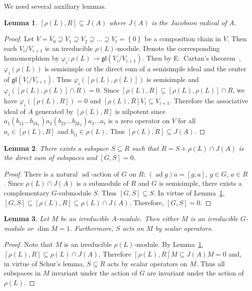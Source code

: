 \documentclass[12pt, reqno, a4paper]{amsart}
\theoremstyle{plain}
\newtheorem{lemma}{Lemma}
\theoremstyle{remark}
\theoremstyle{definition}
\begin{document}
We need several auxiliary lemmas.

\begin{lemma}\label{LemmaLR}
$[\rho(L), R] \subseteq J(A)$ where $J(A)$ is the Jacobson radical of $A$.
\end{lemma}
\begin{proof}
Let $V = V_0 \supseteq V_1 \supseteq V_2 \supseteq \ldots \supseteq V_t = \left\lbrace 0 \right\rbrace$
be a composition chain in $V$.
Then each $V_i/V_{i+1}$ is an irreducible $\rho(L)$-module.
Denote the corresponding homomorphism by $\varphi_i \colon \rho(L) \to
\mathfrak{gl}(V_i/V_{i+1})$. Then by E.~Cartan's theorem~\cite[Proposition~1.4.11]{GotoGrosshans},
$\varphi_i (\rho(L))$ is semisimple or the direct sum of a semisimple ideal and
the center of $\mathfrak{gl}(V_i/V_{i+1})$.
Thus $\varphi_i ([ \rho(L), \rho(L)])$ is semisimple
and $\varphi_i ([ \rho(L), \rho(L)] \cap R) = 0$.
Since $[\rho(L), R] \subseteq [\rho(L), \rho(L)] \cap R$,
we have $\varphi_i([\rho(L), R])=0$ and $[\rho(L), R]V_i \subseteq V_{i+1}$.
Therefore the associative ideal of $A$ generated by $[\rho(L), R]$ is nilpotent
since $a_1 (b_{11} \ldots b_{1k_1}) a_2 (b_{21} \ldots b_{2k_2})
a_3 \ldots a_t$ is a zero operator on $V$
for all  $a_i \in [\rho(L), R]$ and $b_{ij} \in \rho(L)$.
Thus $[\rho(L), R] \subseteq J(A)$.
\end{proof}

\begin{lemma}\label{LemmaRS}
There exists a subspace $S \subseteq R$ such that
$R = S + \rho(L)\cap J(A)$ is
the direct sum of subspaces and $[G,S]=0$.
\end{lemma}
\begin{proof}
There is a natural $\operatorname{ad}$-action of $G$
on $R$: $(\operatorname{ad} g)a = [g,a]$, $g \in G$, $a\in R$.
Since $\rho(L)\cap J(A)$ is a submodule of $R$ and
$G$ is semisimple,
there exists a complementary $G$-submodule $S$.
Thus $[G,S] \subseteq S$. In virtue of Lemma~\ref{LemmaLR},
$[G,S] \subseteq [\rho(L),R] \subseteq \rho(L) \cap J(A)$.
Therefore, $[G,S]=0$.
\end{proof}

\begin{lemma}\label{LemmaIrr}
Let $M$ be an irreducible $A$-module.
Then either $M$ is an irreducible $G$-module or
$\dim M = 1$.
Furthermore, $S$ acts on $M$ by scalar operators.
\end{lemma}
\begin{proof}
Note that $M$ is an irreducible $\rho(L)$-module.
By Lemma~\ref{LemmaLR}, $[\rho(L), R] \subseteq \rho(L) \cap J(A)$.
Therefore $[\rho(L), R]M\subseteq J(A)M = 0$
and, in virtue of Schur's lemma, $S \subseteq R$ acts by scalar operators on
$M$.
Thus all subspaces in $M$ invariant under the action of $G$
are invariant under the action of $\rho(L)$.
\end{proof}
\end{document}
